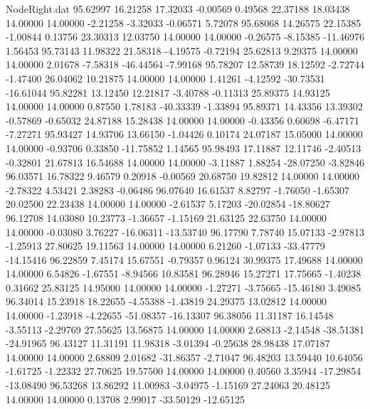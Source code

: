 \begin{filecontents}{NodeRight.dat}
  95.62997   16.21258   17.32033    -0.00569    0.49568   22.37188   18.03438   14.00000   14.00000   -2.21258   -3.32033   -0.06571    5.72078
  95.68068   14.26575   22.15385    -1.00844    0.13756   23.30313   12.03750   14.00000   14.00000   -0.26575   -8.15385  -11.46976    1.56453
  95.73143   11.98322   21.58318    -4.19575   -0.72194   25.62813    9.29375   14.00000   14.00000    2.01678   -7.58318  -46.44564   -7.99168
  95.78207   12.58739   18.12592    -2.72744   -1.47400   26.04062   10.21875   14.00000   14.00000    1.41261   -4.12592  -30.73531  -16.61044
  95.82281   13.12450   12.21817    -3.40788   -0.11313   25.89375   14.93125   14.00000   14.00000    0.87550    1.78183  -40.33339   -1.33894
  95.89371   14.43356   13.39302    -0.57869   -0.65032   24.87188   15.28438   14.00000   14.00000   -0.43356    0.60698   -6.47171   -7.27271
  95.93427   14.93706   13.66150    -1.04426    0.10174   24.07187   15.05000   14.00000   14.00000   -0.93706    0.33850  -11.75852    1.14565
  95.98493   17.11887   12.11746    -2.40513   -0.32801   21.67813   16.54688   14.00000   14.00000   -3.11887    1.88254  -28.07250   -3.82846
  96.03571   16.78322    9.46579     0.20918   -0.00569   20.68750   19.82812   14.00000   14.00000   -2.78322    4.53421    2.38283   -0.06486
  96.07640   16.61537    8.82797    -1.76050   -1.65307   20.02500   22.23438   14.00000   14.00000   -2.61537    5.17203  -20.02854  -18.80627
  96.12708   14.03080   10.23773    -1.36657   -1.15169   21.63125   22.63750   14.00000   14.00000   -0.03080    3.76227  -16.06311  -13.53740
  96.17790    7.78740   15.07133    -2.97813   -1.25913   27.80625   19.11563   14.00000   14.00000    6.21260   -1.07133  -33.47779  -14.15416
  96.22859    7.45174   15.67551    -0.79357    0.96124   30.99375   17.49688   14.00000   14.00000    6.54826   -1.67551   -8.94566   10.83581
  96.28946   15.27271   17.75665    -1.40238    0.31662   25.83125   14.95000   14.00000   14.00000   -1.27271   -3.75665  -15.46180    3.49085
  96.34014   15.23918   18.22655    -4.55388   -1.43819   24.29375   13.02812   14.00000   14.00000   -1.23918   -4.22655  -51.08357  -16.13307
  96.38056   11.31187   16.14548    -3.55113   -2.29769   27.55625   13.56875   14.00000   14.00000    2.68813   -2.14548  -38.51381  -24.91965
  96.43127   11.31191   11.98318    -3.01394   -0.25638   28.98438   17.07187   14.00000   14.00000    2.68809    2.01682  -31.86357   -2.71047
  96.48203   13.59440   10.64056    -1.61725   -1.22332   27.70625   19.57500   14.00000   14.00000    0.40560    3.35944  -17.29854  -13.08490
  96.53268   13.86292   11.00983    -3.04975   -1.15169   27.24063   20.48125   14.00000   14.00000    0.13708    2.99017  -33.50129  -12.65125

\end{filecontents}
